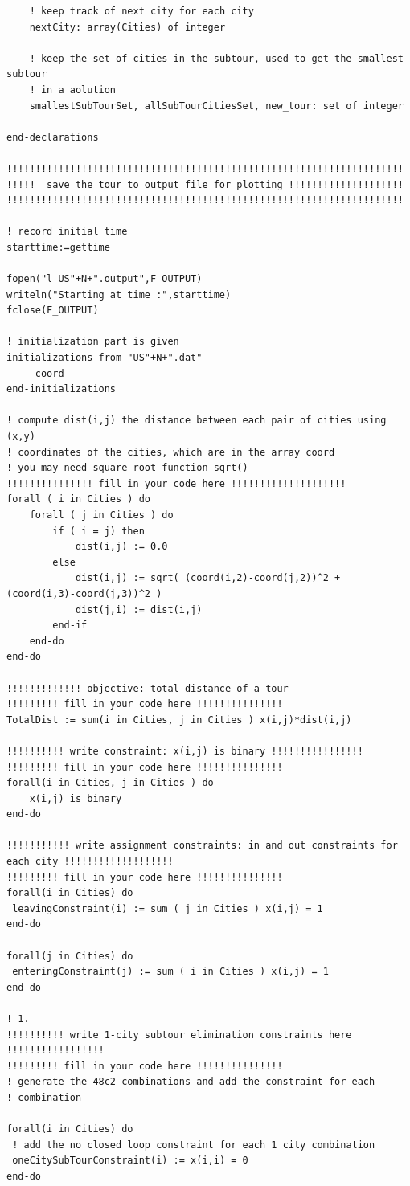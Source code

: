 \documentclass[twoside,12pt]{article}
\begin{document}
\begin{verbatim}
	! keep track of next city for each city
	nextCity: array(Cities) of integer
	
	! keep the set of cities in the subtour, used to get the smallest subtour
	! in a aolution
	smallestSubTourSet, allSubTourCitiesSet, new_tour: set of integer
	
end-declarations

!!!!!!!!!!!!!!!!!!!!!!!!!!!!!!!!!!!!!!!!!!!!!!!!!!!!!!!!!!!!!!!!!!!!!
!!!!!  save the tour to output file for plotting !!!!!!!!!!!!!!!!!!!!
!!!!!!!!!!!!!!!!!!!!!!!!!!!!!!!!!!!!!!!!!!!!!!!!!!!!!!!!!!!!!!!!!!!!!

! record initial time
starttime:=gettime 

fopen("l_US"+N+".output",F_OUTPUT)
writeln("Starting at time :",starttime)
fclose(F_OUTPUT)

! initialization part is given 
initializations from "US"+N+".dat"
     coord
end-initializations

! compute dist(i,j) the distance between each pair of cities using (x,y) 
! coordinates of the cities, which are in the array coord
! you may need square root function sqrt()
!!!!!!!!!!!!!!! fill in your code here !!!!!!!!!!!!!!!!!!!! 
forall ( i in Cities ) do
	forall ( j in Cities ) do
		if ( i = j) then
			dist(i,j) := 0.0
		else
			dist(i,j) := sqrt( (coord(i,2)-coord(j,2))^2 + (coord(i,3)-coord(j,3))^2 )
			dist(j,i) := dist(i,j)
		end-if
	end-do
end-do

!!!!!!!!!!!!! objective: total distance of a tour
!!!!!!!!! fill in your code here !!!!!!!!!!!!!!!
TotalDist := sum(i in Cities, j in Cities ) x(i,j)*dist(i,j)

!!!!!!!!!! write constraint: x(i,j) is binary !!!!!!!!!!!!!!!!
!!!!!!!!! fill in your code here !!!!!!!!!!!!!!!
forall(i in Cities, j in Cities ) do
	x(i,j) is_binary
end-do

!!!!!!!!!!! write assignment constraints: in and out constraints for each city !!!!!!!!!!!!!!!!!!!
!!!!!!!!! fill in your code here !!!!!!!!!!!!!!!
forall(i in Cities) do
 leavingConstraint(i) := sum ( j in Cities ) x(i,j) = 1 
end-do

forall(j in Cities) do
 enteringConstraint(j) := sum ( i in Cities ) x(i,j) = 1 
end-do

! 1.
!!!!!!!!!! write 1-city subtour elimination constraints here !!!!!!!!!!!!!!!!!
!!!!!!!!! fill in your code here !!!!!!!!!!!!!!!
! generate the 48c2 combinations and add the constraint for each
! combination

forall(i in Cities) do
 ! add the no closed loop constraint for each 1 city combination
 oneCitySubTourConstraint(i) := x(i,i) = 0 
end-do



\end{verbatim}
\end{document}

